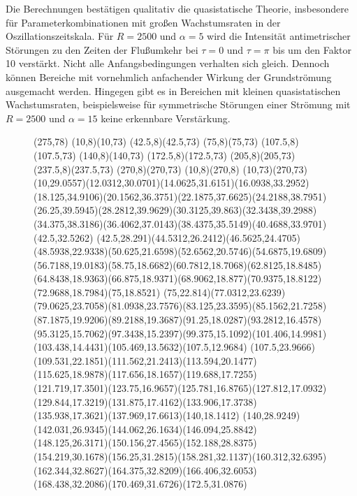 \documentclass[10pt,a5paper,oneside,draft]{book}
\numberwithin{equation}{chapter}
\begin{document}
Die Berechnungen best\"atigen qualitativ die quasistatische Theorie, insbesondere f\"ur Parameterkombinationen mit gro\ss en Wachstumsraten in der Oszillationszeitskala.
F\"ur $R=2500$ und $\alpha=5$ wird die Intensit\"at antimetrischer St\"orungen zu den Zeiten der Flu\ss umkehr bei $\tau=0$ und $\tau=\pi$ bis um den Faktor 10 verst\"arkt.
Nicht alle Anfangsbedingungen verhalten sich gleich.
Dennoch k\"onnen Bereiche mit vornehmlich anfachender Wirkung der Grundstr\"omung ausgemacht werden.
Hingegen gibt es in Bereichen mit kleinen quasistatischen Wachstumsraten, beispielsweise f\"ur symmetrische St\"orungen einer Str\"omung mit $R=2500$ und $\alpha=15$ keine erkennbare Verst\"arkung.

\begin{figure} %
	\begin{picture}(275,78)
		\thinlines
		\drawline(10,8)(10,73)
		\drawline(42.5,8)(42.5,73)
		\drawline(75,8)(75,73)
		\drawline(107.5,8)(107.5,73)
		\drawline(140,8)(140,73)
		\drawline(172.5,8)(172.5,73)
		\drawline(205,8)(205,73)
		\drawline(237.5,8)(237.5,73)
		\drawline(270,8)(270,73)
		\drawline(10,8)(270,8)
		\drawline(10,73)(270,73)
		\thicklines
		\drawline(10,29.0557)(12.0312,30.0701)(14.0625,31.6151)(16.0938,33.2952)(18.125,34.9106)(20.1562,36.3751)(22.1875,37.6625)(24.2188,38.7951)(26.25,39.5945)(28.2812,39.9629)(30.3125,39.863)(32.3438,39.2988)(34.375,38.3186)(36.4062,37.0143)(38.4375,35.5149)(40.4688,33.9701)(42.5,32.5262)
		\drawline(42.5,28.291)(44.5312,26.2412)(46.5625,24.4705)(48.5938,22.9338)(50.625,21.6598)(52.6562,20.5746)(54.6875,19.6809)(56.7188,19.0183)(58.75,18.6682)(60.7812,18.7068)(62.8125,18.8485)(64.8438,18.9363)(66.875,18.9371)(68.9062,18.877)(70.9375,18.8122)(72.9688,18.7984)(75,18.8521)
		\drawline(75,22.814)(77.0312,23.6239)(79.0625,23.7058)(81.0938,23.7576)(83.125,23.3595)(85.1562,21.7258)(87.1875,19.9206)(89.2188,19.3687)(91.25,18.0287)(93.2812,16.4578)(95.3125,15.7062)(97.3438,15.2397)(99.375,15.1092)(101.406,14.9981)(103.438,14.4431)(105.469,13.5632)(107.5,12.9684)
		\drawline(107.5,23.9666)(109.531,22.1851)(111.562,21.2413)(113.594,20.1477)(115.625,18.9878)(117.656,18.1657)(119.688,17.7255)(121.719,17.3501)(123.75,16.9657)(125.781,16.8765)(127.812,17.0932)(129.844,17.3219)(131.875,17.4162)(133.906,17.3738)(135.938,17.3621)(137.969,17.6613)(140,18.1412)
		\drawline(140,28.9249)(142.031,26.9345)(144.062,26.1634)(146.094,25.8842)(148.125,26.3171)(150.156,27.4565)(152.188,28.8375)(154.219,30.1678)(156.25,31.2815)(158.281,32.1137)(160.312,32.6395)(162.344,32.8627)(164.375,32.8209)(166.406,32.6053)(168.438,32.2086)(170.469,31.6726)(172.5,31.0876)

\end{picture}
\end{figure}
\end{document}
